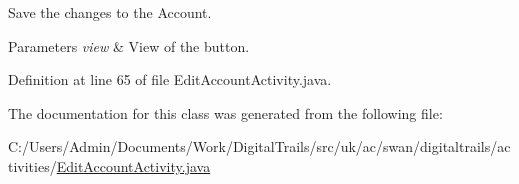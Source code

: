 Save the changes to the Account. 


\begin{DoxyParams}{Parameters}
{\em view} & View of the button. \\
\hline
\end{DoxyParams}


Definition at line 65 of file Edit\+Account\+Activity.\+java.



The documentation for this class was generated from the following file\+:\begin{DoxyCompactItemize}
\item 
C\+:/\+Users/\+Admin/\+Documents/\+Work/\+Digital\+Trails/src/uk/ac/swan/digitaltrails/activities/\hyperlink{_edit_account_activity_8java}{Edit\+Account\+Activity.\+java}\end{DoxyCompactItemize}
